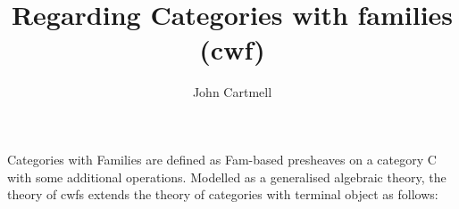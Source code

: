 \documentclass[10pt,a4paper]{article}
\theoremstyle{remark}
\begin{document}
\title{Regarding Categories with families (cwf)}


\author{John Cartmell}

\newenvironment{gatrules}
{
$$
\begin{array}{l l}
}
{
\end{array}
$$
}
\newcommand{\gatintros}
{
\textbf{Symbol} & \textbf{Introductory\ Rule}                      \\}
\newcommand{\gataxioms}
{\textbf{Axioms}\\}
\newcommand{\gatintro}[3]{\ #1 & #2 \tstyle #3 \\}
\newcommand{\gataxiom}[2]{\multicolumn{2}{l}{\ \ #1\mbox{,  whenever\ } #2} \\}
\newcommand{\noleft}{\left.\kern-\nulldelimiterspace} %
\newcommand{\gatmultiaxiom}[2]
{\multicolumn{2}{l}{
  \noleft
    \begin{array}{l}
		#1
    \end{array} 
  \right\} \mbox{whenever\ } 	#2 
	}\\}
	
\newcommand{\mytypefill}{\rule[0.5cm]{0.7cm}{0pt}}
\newcommand{\mytermfill}{\rule[0.5cm]{0.7cm}{0pt}}
\newcommand{\termballoon}[2]
{\ovalnode[linecolor=gray]{#1}{\rput(0.4,0.3){\text {\footnotesize \(#2\)}}\rput(0.3,0.1){\dotnode[dotsize=2pt]{#1.point}}\mytermfill}}
\newcommand{\typeballoon}[2]
{\ovalnode[linecolor=gray]{#1}{\rput(0.63,0.3){\text {\footnotesize \(#2\)}}\rput(0.3,0.2){\dotnode[dotsize=2pt]{#1.point}}\mytypefill}}
\newcommand{\emptyballoon}[1]
{\ovalnode[linecolor=gray]{#1}{\mytypefill}}

\newcommand{\typetether}[1]
          {\ncline[offsetA=2pt,nodesepB=6pt, linecolor=gray]{Ty.#1}{#1}
					 \ncline[offsetA=-2pt,nodesepB=6pt, linecolor=gray]{Ty.#1}{#1}}
\newcommand{\termtether}[2]
          {\ncline[offsetA=-2pt,nodesepB=3pt, linecolor=gray]{#1}{#2}
           \ncline[offsetA=2pt,nodesepB=3pt,  linecolor=gray]{#1}{#2}}
					
\note
Categories with Families are defined as Fam-based presheaves on a category C with some additional operations. Modelled as a generalised algebraic theory, the theory of cwfs extends the theory of categories with terminal object as follows:
\end{document}
